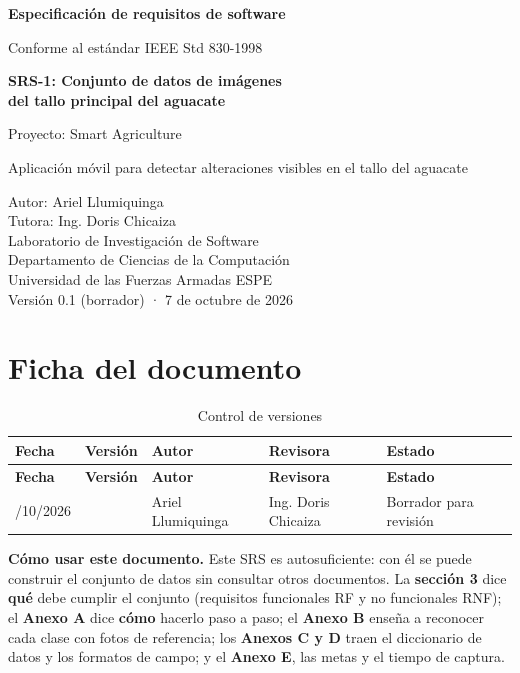 \documentclass[11pt]{article}
\begin{document}
\begin{titlepage}
\centering
\vspace*{2.5cm}
{\Large\bfseries Especificación de requisitos de software\par}
\vspace{0.4cm}
{\large Conforme al estándar IEEE Std 830-1998\par}
\vspace{1.6cm}
{\LARGE\bfseries SRS-1: Conjunto de datos de imágenes\\[4pt] del tallo principal del aguacate\par}
\vspace{1.4cm}
{\large Proyecto: Smart Agriculture\par}
\vspace{0.3cm}
{\normalsize Aplicación móvil para detectar alteraciones visibles en el tallo del aguacate\par}
\vfill
{\normalsize
Autor: Ariel Llumiquinga\\
Tutora: Ing. Doris Chicaiza\\[6pt]
Laboratorio de Investigación de Software\\
Departamento de Ciencias de la Computación\\
Universidad de las Fuerzas Armadas ESPE\\[10pt]
Versión 0.1 (borrador) · 7 de octubre de 2026\par}
\end{titlepage}

\section*{Ficha del documento}
{\small
\begin{longtable}{|>{\RaggedRight\arraybackslash}p{2.29cm}|>{\RaggedRight\arraybackslash}p{1.53cm}|>{\RaggedRight\arraybackslash}p{3.43cm}|>{\RaggedRight\arraybackslash}p{3.43cm}|>{\RaggedRight\arraybackslash}p{3.43cm}|}
\caption{Control de versiones}\\
\hline
\rowcolor{encabezado}\textbf{Fecha} & \textbf{Versión} & \textbf{Autor} & \textbf{Revisora} & \textbf{Estado} \\ \hline
\endfirsthead
\hline
\rowcolor{encabezado}\textbf{Fecha} & \textbf{Versión} & \textbf{Autor} & \textbf{Revisora} & \textbf{Estado} \\ \hline
\endhead
07/10/2026 & 0.1 & Ariel Llumiquinga & Ing. Doris Chicaiza & Borrador para revisión \\ \hline
\end{longtable}}
\textbf{Cómo usar este documento.} Este SRS es autosuficiente: con él se puede construir el conjunto de datos sin consultar otros documentos. La \textbf{sección 3} dice \textbf{qué} debe cumplir el conjunto (requisitos funcionales RF y no funcionales RNF); el \textbf{Anexo A} dice \textbf{cómo} hacerlo paso a paso; el \textbf{Anexo B} enseña a reconocer cada clase con fotos de referencia; los \textbf{Anexos C y D} traen el diccionario de datos y los formatos de campo; y el \textbf{Anexo E}, las metas y el tiempo de captura.
\end{document}
